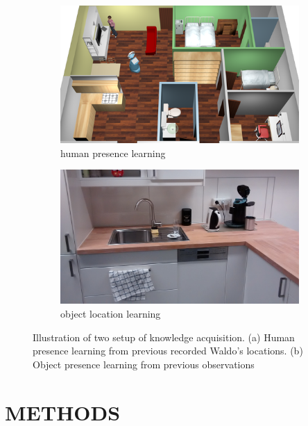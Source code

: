 \documentclass[a4paper, 10pt, conference]{ieeeconf}      %
\begin{document}
\begin{figure}[!tbp]
  \begin{subfigure}[b]{0.21\textwidth}
    \includegraphics[width=\textwidth]{aruba-flat.png}
    \caption{human presence learning}
    \label{fig:f1}
  \end{subfigure}
  \hspace{1em}
  \begin{subfigure}[b]{0.21\textwidth}
    \includegraphics[width=\textwidth]{object_locations.jpg}
    \caption{object location learning}
    \label{fig:f2}
  \end{subfigure}
  \caption{Illustration of two setup of  knowledge acquisition. (a) Human presence learning from previous recorded Waldo’s locations. \cite{c5} (b) Object presence learning from previous observations}
\end{figure}

\section{METHODS}
\end{document}
